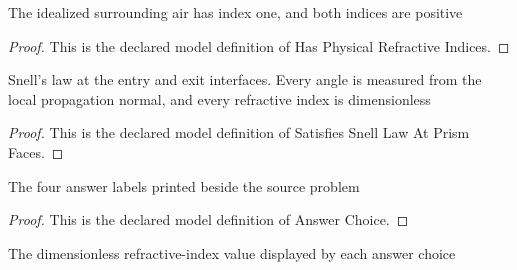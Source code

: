 \begin{definition}
  \label{def:physics:phyx-mini-0050:phyxminiproblems-problemphyxmini0050-hasphysicalrefractiveindices}
  The idealized surrounding air has index one, and both indices are positive
\end{definition}
\begin{proof}
  This is the declared model definition of Has Physical Refractive Indices.
\end{proof}
\begin{definition}
  \label{def:physics:phyx-mini-0050:phyxminiproblems-problemphyxmini0050-satisfiessnelllawatprismfaces}
  Snell's law at the entry and exit interfaces. Every angle is measured from the local propagation normal, and every refractive index is dimensionless
\end{definition}
\begin{proof}
  This is the declared model definition of Satisfies Snell Law At Prism Faces.
\end{proof}
\begin{definition}
  \label{def:physics:phyx-mini-0050:phyxminiproblems-problemphyxmini0050-answerchoice}
  The four answer labels printed beside the source problem
\end{definition}
\begin{proof}
  This is the declared model definition of Answer Choice.
\end{proof}
\begin{definition}
  \label{def:physics:phyx-mini-0050:phyxminiproblems-problemphyxmini0050-answerrefractiveindex}
  The dimensionless refractive-index value displayed by each answer choice
\end{definition}
